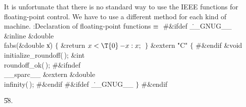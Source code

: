 It is unfortunate that there is no standard way to use the IEEE functions
for floating-point control.  We have to use a different
method for each kind of machine.
\Y\B\4:Declaration of floating-point functions\X${}\equiv{}$\6
\8\#\&{ifdef} \.{\_\_GNUG\_\_}\6
\&{inline} \&{double} \\{fabs}(\&{double} \|x)\1\1\2\2\6
${}\{{}$\1\6
\&{return} ${}\|x<\T{0}\?{-}\|x:\|x;{}$\6
\4${}\}{}$\2\7
\&{extern} \.{"C"}\1\1\2\2\6
${}\{{}$\6
\8\#\&{endif}\1\6
\&{void} \\{initialize\_roundoff}(\,);\6
\&{int} \\{roundoff\_ok}(\,);\6
\8\#\&{ifndef} \\{\_\_sparc\_\_}\6
\&{extern} \&{double} \\{infinity}(\,);\6
\8\#\&{endif}\6
\8\#\&{ifdef} \.{\_\_GNUG\_\_}\6
\4${}\}{}$\2\6
\8\#\&{endif}\par
\U58.\fi

